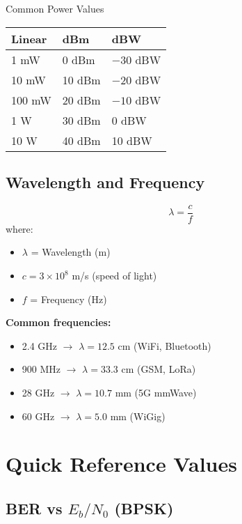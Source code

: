 \begin{calloutbox}{Common Power Values}
\begin{tabular}{@{}lll@{}}
\toprule
Linear & dBm & dBW \\
\midrule
1 mW & 0 dBm & $-30$ dBW \\
10 mW & 10 dBm & $-20$ dBW \\
100 mW & 20 dBm & $-10$ dBW \\
1 W & 30 dBm & 0 dBW \\
10 W & 40 dBm & 10 dBW \\
\bottomrule
\end{tabular}
\end{calloutbox}

\subsection{Wavelength and Frequency}

\begin{equation}
\lambda = \frac{c}{f}
\label{eq:wavelength-frequency}
\end{equation}
where:
\begin{itemize}
\item $\lambda$ = Wavelength (m)
\item $c = 3 \times 10^8$ m/s (speed of light)
\item $f$ = Frequency (Hz)
\end{itemize}

\textbf{Common frequencies:}
\begin{itemize}
\item 2.4 GHz $\rightarrow$ $\lambda = 12.5$ cm (WiFi, Bluetooth)
\item 900 MHz $\rightarrow$ $\lambda = 33.3$ cm (GSM, LoRa)
\item 28 GHz $\rightarrow$ $\lambda = 10.7$ mm (5G mmWave)
\item 60 GHz $\rightarrow$ $\lambda = 5.0$ mm (WiGig)
\end{itemize}

\section{Quick Reference Values}
\label{sec:quick-reference-values}

\subsection{BER vs $E_b/N_0$ (BPSK)}

